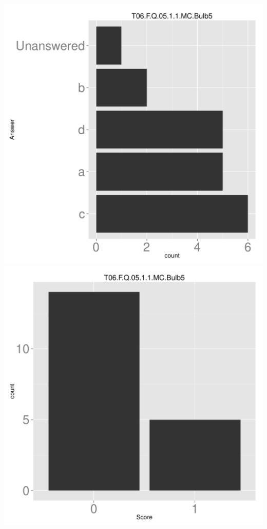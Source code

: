 \documentclass[12pt,nohyper]{tufte-handout}\usepackage[]{graphicx}\usepackage[]{color}
\begin{document}
\begin{center} \includegraphics[width=.45\linewidth]{Topic06_66_answer} \includegraphics[width=.45\linewidth]{Topic06_66_score} \end{center} 
\end{document}
